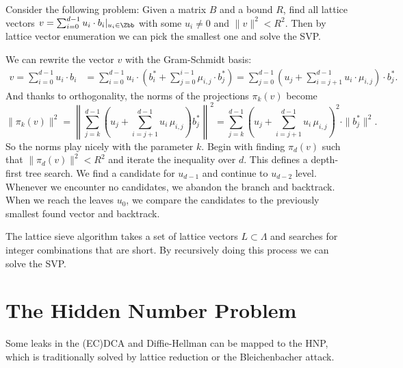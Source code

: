 \begin{definition}[Enumeration]
    Consider the following problem: Given a matrix $B$ and a bound $R$, find all lattice vectors $v = \sum_{i=0}^{d-1} u_i \cdot b_i |_{u_i \in \Zbb}$ with some $u_i \not = 0$ and $\|v\|^2 < R^2$. Then by lattice vector enumeration we can pick the smallest one and solve the SVP.

    We can rewrite the vector $v$ with the Gram-Schmidt basis:
    \begin{align*}
        v = \sum_{i=0}^{d-1} u_i \cdot b_i &= \sum_{i=0}^{d-1} u_i \cdot \left( b_i^* + \sum_{j=0}^{i-1} \mu_{i,j} \cdot b_j^* \right) = \sum_{j=0}^{d-1} \left( u_j + \sum_{i=j+1}^{d-1} u_i \cdot \mu_{i,j} \right) \cdot b_j^*.
    \end{align*}
    And thanks to orthogonality, the norms of the projections $\pi_k(v)$ become
    \begin{equation*}
        \| \pi_k(v) \|^2 = \left\| \sum_{j=k}^{d-1} \left( u_j + \sum_{i=j+1}^{d-1} u_i \, \mu_{i,j} \right) b_j^* \right\|^2 = \sum_{j=k}^{d-1} \left( u_j + \sum_{i=j+1}^{d-1} u_i \, \mu_{i,j} \right)^2 \cdot \| b_j^* \|^2.
    \end{equation*}
    So the norms play nicely with the parameter $k$. Begin with finding $\pi_d(v)$ such that $\| \pi_d(v) \|^2 < R^2$
    and iterate the inequality over $d$. This defines a depth-first tree search. We find a candidate for $u_{d-1}$ and continue to $u_{d-2}$ level. Whenever we encounter no candidates, we abandon the branch and backtrack. When we reach the leaves $u_0$, we compare the candidates to the previously smallest found vector and backtrack.
\end{definition}

\begin{definition}[Sieving]
    The lattice sieve algorithm takes a set of lattice vectors $L \subset \Lambda$ and searches for integer combinations that are short. By recursively doing this process we can solve the SVP.
\end{definition}

\begin{definition}[LLL]
    
\end{definition}
\begin{definition}[BKZ]
    
\end{definition}


\section{The Hidden Number Problem}
Some leaks in the (EC)DCA and Diffie-Hellman can be mapped to the HNP, which is traditionally solved by lattice reduction or the Bleichenbacher attack.

